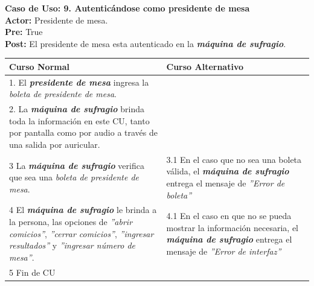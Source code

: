 \documentclass[spanish, 10pt,a4paper]{article}
\numberwithin{equation}{section} %
\begin{document}
\noindent\textbf{Caso de Uso: 9. Autenticándose como presidente de mesa}\\
\textbf{Actor: } Presidente de mesa.\\
\textbf{Pre: } True\\
\textbf{Post: } El presidente de mesa esta autenticado en la \textbf{\textit{máquina de sufragio}}.\\
\begin{table}[H]
  \centering
\bgroup
\def\arraystretch{1.3}
  \begin{tabular}{p{9cm} | p{7cm}}
    \hline
    Curso Normal & Curso Alternativo \\
    \hline
    \hline    
    1. El \textbf{\textit{presidente de mesa}} ingresa la \textit{boleta de presidente de mesa}. 
    & \\
    
    \hline
    2. La \textbf{\textit{máquina de sufragio}} brinda toda la información en este CU, tanto por pantalla como por audio a través de una salida por auricular.
    &
    \\
    
    \hline
    3 La \textbf{\textit{máquina de sufragio}} verifica que sea una \textit{boleta de presidente de mesa}.
    & 
    3.1 En el caso que no sea una boleta válida, el \textbf{\textit{máquina de sufragio}} entrega el mensaje de \textit{''Error de boleta''}
    \\
    
    \hline
    4 El \textbf{\textit{máquina de sufragio}} le brinda a la persona, las opciones de \textit{''abrir comicios''}, \textit{''cerrar comicios''}, \textit{''ingresar resultados''} y \textit{''ingresar número de mesa''}.
    & 
    4.1 En el caso en que no se pueda mostrar la información necesaria, el \textbf{\textit{máquina de sufragio}} entrega el mensaje de \textit{''Error de interfaz''}
    \\
    

    \hline
    5 Fin de CU
    & \\
    \hline
  \end{tabular}
\egroup
\end{table}
\end{document}
